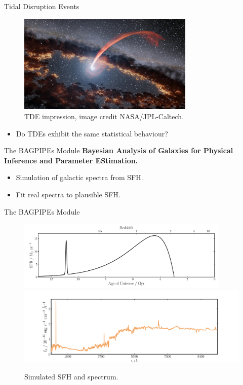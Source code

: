 \documentclass{beamer}
\begin{document}
\begin{frame}{Tidal Disruption Events}
  \begin{figure}
    \includegraphics[width=0.75\textwidth]{tidal_disruption_event}
    \caption{TDE impression, image credit NASA/JPL-Caltech.}
    \label{img:tde_impression}
  \end{figure}
  \begin{itemize}
    \item Do TDEs exhibit the same statistical behaviour?
  \end{itemize}
\end{frame}

\begin{frame}{The BAGPIPEs Module}
  \textbf{Bayesian Analysis of Galaxies for Physical Inference and Parameter EStimation.}
  \vspace{0.5in}
  \begin{itemize}
    \item Simulation of galactic spectra from SFH.
    \item Fit real spectra to plausible SFH.
  \end{itemize}
\end{frame}

\begin{frame}{The BAGPIPEs Module}
  \begin{figure}
    \centering
    \includegraphics[width=0.9\textwidth]{model020_sfh}
    \includegraphics[width=\textwidth]{model020_spectrum}
    \caption{Simulated SFH and spectrum.}
  \end{figure}
\end{frame}
\end{document}
